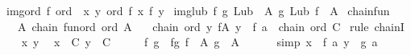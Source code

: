 \begin{isabellebody}
\isamarkupfalse%
\ {\isachardoublequoteopen}img{\isacharunderscore}{\kern0pt}ord\ f\ ord\ {\isacharequal}{\kern0pt}\ {\isacharparenleft}{\kern0pt}{\isasymlambda}x\ y{\isachardot}{\kern0pt}\ ord\ {\isacharparenleft}{\kern0pt}f\ x{\isacharparenright}{\kern0pt}\ {\isacharparenleft}{\kern0pt}f\ y{\isacharparenright}{\kern0pt}{\isacharparenright}{\kern0pt}{\isachardoublequoteclose}\isanewline
{}\isamarkupfalse%
\ {\isachardoublequoteopen}img{\isacharunderscore}{\kern0pt}lub\ f\ g\ Lub\ {\isacharequal}{\kern0pt}\ {\isacharparenleft}{\kern0pt}{\isasymlambda}A{\isachardot}{\kern0pt}\ g\ {\isacharparenleft}{\kern0pt}Lub\ {\isacharparenleft}{\kern0pt}f\ {\isacharbackquote}{\kern0pt}\ A{\isacharparenright}{\kern0pt}{\isacharparenright}{\kern0pt}{\isacharparenright}{\kern0pt}{\isachardoublequoteclose}\isanewline
\isanewline
{}\isamarkupfalse%
\ chain{\isacharunderscore}{\kern0pt}fun{\isacharcolon}{\kern0pt}\ \isanewline
\ \ \ A{\isacharcolon}{\kern0pt}\ {\isachardoublequoteopen}chain\ {\isacharparenleft}{\kern0pt}fun{\isacharunderscore}{\kern0pt}ord\ ord{\isacharparenright}{\kern0pt}\ A{\isachardoublequoteclose}\isanewline
\ \ \ {\isachardoublequoteopen}chain\ ord\ {\isacharbraceleft}{\kern0pt}y{\isachardot}{\kern0pt}\ {\isasymexists}f{\isasymin}A{\isachardot}{\kern0pt}\ y\ {\isacharequal}{\kern0pt}\ f\ a{\isacharbraceright}{\kern0pt}{\isachardoublequoteclose}\ {\isacharparenleft}{\kern0pt}\ {\isachardoublequoteopen}chain\ ord\ {\isacharquery}{\kern0pt}C{\isachardoublequoteclose}{\isacharparenright}{\kern0pt}\isanewline
%
\isadelimproof
%
\endisadelimproof
%
\isatagproof
{}\isamarkupfalse%
\ {\isacharparenleft}{\kern0pt}rule\ chainI{\isacharparenright}{\kern0pt}\isanewline
\ \ \isamarkupfalse%
\ x\ y\ \isamarkupfalse%
\ {\isachardoublequoteopen}x\ {\isasymin}\ {\isacharquery}{\kern0pt}C{\isachardoublequoteclose}\ {\isachardoublequoteopen}y\ {\isasymin}\ {\isacharquery}{\kern0pt}C{\isachardoublequoteclose}\isanewline
\ \ \isamarkupfalse%
\ \isamarkupfalse%
\ f\ g\ \ fg{\isacharcolon}{\kern0pt}\ {\isachardoublequoteopen}f\ {\isasymin}\ A{\isachardoublequoteclose}\ {\isachardoublequoteopen}g\ {\isasymin}\ A{\isachardoublequoteclose}\ \isanewline
\ \ \ \ \ {\isacharbrackleft}{\kern0pt}simp{\isacharbrackright}{\kern0pt}{\isacharcolon}{\kern0pt}\ {\isachardoublequoteopen}x\ {\isacharequal}{\kern0pt}\ f\ a{\isachardoublequoteclose}\ {\isachardoublequoteopen}y\ {\isacharequal}{\kern0pt}\ g\ a{\isachardoublequoteclose}\ \isamarkupfalse%

\end{isabellebody}
